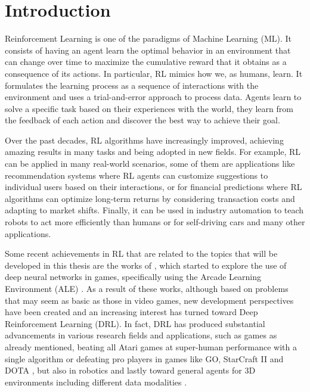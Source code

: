 
\chapter{Introduction}
\label{sec:introduction}
Reinforcement Learning \citep{sutton1998introduction} is one of the paradigms of Machine Learning (ML). It consists of having an agent learn the optimal behavior in an environment that can change over time to maximize the cumulative reward that it obtains as a consequence of its actions.
In particular, RL mimics how we, as humans, learn.
It formulates the learning process as a sequence of interactions with the environment and uses a trial-and-error approach to process data.
Agents learn to solve a specific task based on their experiences with the world, they learn from the feedback of each action and discover the best way to achieve their goal.

Over the past decades, RL algorithms have increasingly improved, achieving amazing results in many tasks and being adopted in new fields.
For example, RL can be applied in many real-world scenarios, some of them are applications like recommendation systems where RL agents can customize suggestions to individual users based on their interactions, or for financial predictions where RL algorithms can optimize long-term returns by considering transaction costs and adapting to market shifts. 
Finally, it can be used in industry automation to teach robots to act more efficiently than humans or for self-driving cars and many other applications.


Some recent achievements in RL that are related to the topics that will be developed in this thesis are
the works of \citet{mnih2013playing, mnih2015human}, which started to explore the use of deep neural networks in games, specifically using the Arcade Learning Environment (ALE) \citep{bellemare2013atari}.
As a result of these works, although based on problems that may seem as basic as those in video games, new development perspectives have been created and an increasing interest has turned toward Deep Reinforcement Learning (DRL).
In fact, DRL has produced substantial advancements in various research fields and applications, such as games as already mentioned, beating all Atari games at super-human performance with a single algorithm \citep{agent57} or defeating pro players in games like GO, StarCraft II and DOTA \citep{alphago, starcraft, dota}, but also in robotics \citep{rlrob, bousmalis2023robocat} and lastly toward general agents for 3D environments including different data modalities \citep{sima2024}.

